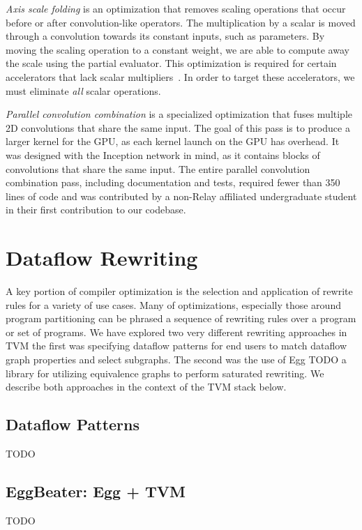 \textit{Axis scale folding} is an optimization that removes scaling
  operations that occur before or after convolution-like operators.
The multiplication by a scalar is moved through a convolution towards
  its constant inputs, such as parameters.
By moving the scaling operation to a constant weight, we are able
  to compute away the scale using the partial evaluator.
This optimization is required for certain accelerators that lack scalar multipliers~\citep{moreau2018vta}.
In order to target these accelerators,
  we must eliminate \textit{all} scalar operations.

\textit{Parallel convolution combination} is a specialized
  optimization that fuses multiple 2D convolutions that share the same input.
The goal of this pass is to produce a larger kernel for the GPU,
  as each kernel launch on the GPU has overhead.
It was designed with the Inception network \citep{inception} in mind, as it
  contains blocks of convolutions that share the same input.
The entire parallel convolution combination pass,
  including documentation and tests,
  required fewer than 350 lines of code and was contributed
  by a non-Relay affiliated undergraduate student
  in their first contribution to our codebase.

\section{Dataflow Rewriting}

A key portion of compiler optimization is
  the selection and application of rewrite rules for a variety
  of use cases.
Many of optimizations, especially those around program partitioning can
  be phrased a sequence of rewriting rules over a program or set of
  programs.
We have explored two very different rewriting approaches in TVM
  the first was specifying dataflow patterns for end users to
  match dataflow graph properties and select subgraphs.
The second was the use of Egg TODO a library
  for utilizing equivalence graphs to perform saturated rewriting.
We describe both approaches in the context of the TVM stack
  below.

\subsection{Dataflow Patterns}
TODO

\subsection{EggBeater: Egg + TVM}
TODO
